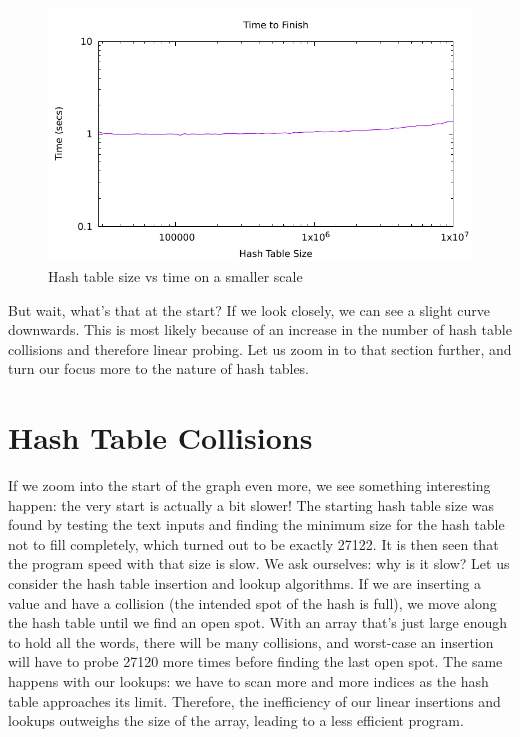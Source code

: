 \documentclass[12pt]{article}
\begin{document}
\begin{figure}[H]\begin{centering}
\includegraphics{plots/small-ht-time.pdf}\caption{Hash table size vs time on a smaller scale}
\end{centering}\end{figure}

But wait, what's that at the start? If we look closely, we can see a slight curve downwards. This is most likely because of an increase in the number of hash table collisions and therefore linear probing. Let us zoom in to that section further, and turn our focus more to the nature of hash tables.

\section{Hash Table Collisions}
If we zoom into the start of the graph even more, we see something interesting happen: the very start is actually a bit slower! The starting hash table size was found by testing the text inputs and finding the minimum size for the hash table not to fill completely, which turned out to be exactly 27122. It is then seen that the program speed with that size is slow. We ask ourselves: why is it slow? Let us consider the hash table insertion and lookup algorithms. If we are inserting a value and have a collision (the intended spot of the hash is full), we move along the hash table until we find an open spot. With an array that's just large enough to hold all the words, there will be many collisions, and worst-case an insertion will have to probe 27120 more times before finding the last open spot. The same happens with our lookups: we have to scan more and more indices as the hash table approaches its limit. Therefore, the inefficiency of our linear insertions and lookups outweighs the size of the array, leading to a less efficient program.
\end{document}

